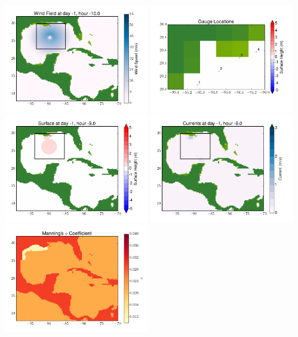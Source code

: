 \documentclass[11pt]{article}
\begin{document}
\vskip 10pt 
\includegraphics[width=0.475\textwidth]{frame0038fig9.png}
\includegraphics[width=0.475\textwidth]{frame0038fig10.png}
\vskip 10pt 
\includegraphics[width=0.475\textwidth]{frame0039fig1.png}
\includegraphics[width=0.475\textwidth]{frame0039fig2.png}
\vskip 10pt 
\includegraphics[width=0.475\textwidth]{frame0039fig3.png}
\end{document}
